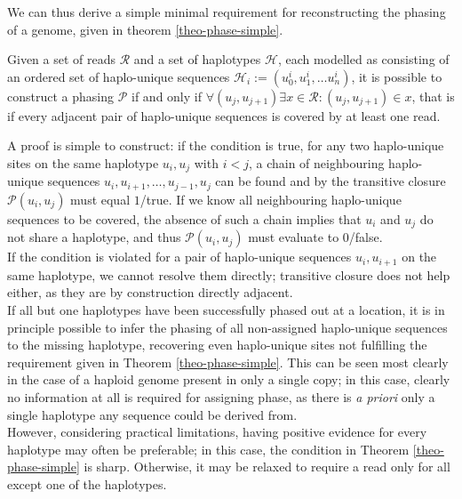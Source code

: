 We can thus derive a simple minimal requirement for reconstructing the phasing of a genome, given in theorem \ref{theo-phase-simple}.

\begin{theorem}
	Given a set of reads $\mathcal{R}$ and a set of haplotypes $\mathcal{H}$, each modelled as consisting of an ordered set of haplo-unique sequences $\mathcal{H}_i := (u^i_0, u^i_1, \dots u^i_n)$, it is possible to construct a phasing $\mathcal{P}$ if and only if $\forall (u_j, u_{j+1}) \exists x \in \mathcal{R}: (u_j, u_{j+1}) \in x$, that is if every adjacent pair of haplo-unique sequences is covered by at least one read.

\label{theo-phase-simple}
\end{theorem}

A proof is simple to construct: if the condition is true, for any two haplo-unique sites on the same haplotype $u_i, u_j$ with $i < j$, a chain of neighbouring haplo-unique sequences $u_i, u_{i+1}, \dots, u_{j-1}, u_{j}$ can be found and by the transitive closure $\mathcal{P}(u_i, u_j)$ must equal $1$/true.
If we know all neighbouring haplo-unique sequences to be covered, the absence of such a chain implies that $u_i$ and $u_j$ do not share a haplotype, and thus $\mathcal{P}(u_i, u_j)$ must evaluate to $0$/false.\\

If the condition is violated for a pair of haplo-unique sequences $u_i, u_{i+1}$ on the same haplotype, we cannot resolve them directly; transitive closure does not help either, as they are by construction directly adjacent.\\
If all but one haplotypes have been successfully phased out at a location, it is in principle possible to infer the phasing of all non-assigned haplo-unique sequences to the missing haplotype, recovering even haplo-unique sites not fulfilling the requirement given in Theorem \ref{theo-phase-simple}.
This can be seen most clearly in the case of a haploid genome present in only a single copy; in this case, clearly no information at all is required for assigning phase, as there is \textit{a priori} only a single haplotype any sequence could be derived from.\\
However, considering practical limitations, having positive evidence for every haplotype may often be preferable; in this case, the condition in Theorem \ref{theo-phase-simple} is sharp.
Otherwise, it may be relaxed to require a read only for all except one of the haplotypes.


